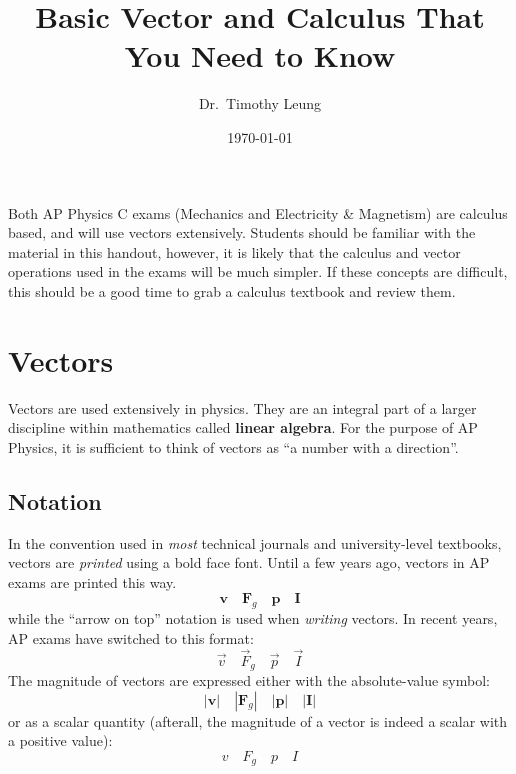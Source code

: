 \documentclass{../../oss-handout}
\title{Basic Vector and Calculus That You Need to Know}
\author{Dr.\ Timothy Leung}
\date{\today}
\begin{document}
\thispagestyle{title}
\gentitle


Both AP Physics C exams (Mechanics and Electricity \& Magnetism) are calculus
based, and will use vectors extensively. Students should be familiar with the
material in this handout, however, it is likely that the calculus and vector
operations used in the exams will be much simpler. If these concepts are
difficult, this should be a good time to grab a calculus textbook and review
them.

\section{Vectors}
Vectors are used extensively in physics. They are an integral part of a larger
discipline within mathematics called \textbf{linear algebra}. For the purpose
of AP Physics, it is sufficient to think of vectors as
``a number with a direction''.

\subsection{Notation}
In the convention used in \emph{most} technical journals and university-level
textbooks, vectors are \emph{printed} using a bold face font. Until a few years
ago, vectors in AP exams are printed this way.
\begin{equation*}
  \bm v\quad\bm F_g\quad\bm p\quad\bm I
\end{equation*}
while the ``arrow on top'' notation is used when \emph{writing} vectors. In
recent years, AP exams have switched to this format:
\begin{equation*}
  \vec v\quad\vec F_g\quad\vec p\quad\vec I
\end{equation*}
The magnitude of vectors are expressed either with the absolute-value symbol:
\begin{equation*}
  |\bm v|\quad|\bm F_g|\quad|\bm p|\quad|\bm I|
\end{equation*}
or as a scalar quantity (afterall, the magnitude of a vector is indeed a scalar
with a positive value):
\begin{equation*}
  v\quad F_g\quad p \quad I
\end{equation*}
\end{document}
